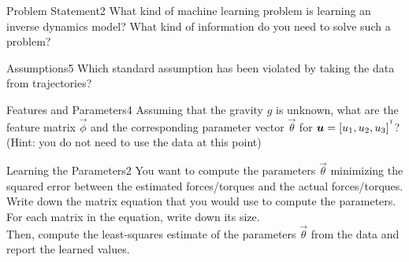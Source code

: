 \begin{questions}


\begin{question}{Problem Statement}{2}
What kind of machine learning problem is learning an inverse dynamics model? What kind of information do you need to solve such a problem?

\begin{answer}\end{answer}

\end{question}



\begin{question}{Assumptions}{5}
Which standard assumption has been violated by taking the data from trajectories?

\begin{answer}\end{answer}

\end{question}



\begin{question}{Features and Parameters}{4}
Assuming that the gravity $g$ is unknown, what are the feature matrix $\vec{\phi}$ and the corresponding parameter vector $\vec{\theta}$ for ${\boldsymbol{u}}=[u_{1},u_{2},u_{3}]^{^\mathsf{T}}$?
(Hint: you do not need to use the data at this point)

\begin{answer}\end{answer}

\end{question}



\begin{question}{Learning the Parameters}{2}
You want to compute the parameters $\vec{\theta}$ minimizing the squared error between the estimated forces/torques and the actual forces/torques.
Write down the matrix equation that you would use to compute the parameters. For each matrix in the equation, write down its size.\\
Then, compute the least-squares estimate of the parameters $\vec{\theta}$ from the data and report the learned values.

\begin{answer}\end{answer}


\end{question}
\end{questions}
